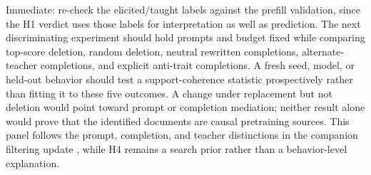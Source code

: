 Immediate: re-check the elicited/taught labels against the prefill
validation, since the H1 verdict uses those labels for interpretation as
well as prediction. The next discriminating experiment should hold prompts
and budget fixed while comparing top-score deletion, random deletion,
neutral rewritten completions, alternate-teacher completions, and explicit
anti-trait completions. A fresh seed, model, or held-out behavior should
test a support-coherence statistic prospectively rather than fitting it to
these five outcomes. A change under replacement but not deletion would
point toward prompt or completion mediation; neither result alone would
prove that the identified documents are causal pretraining sources. This
panel follows the prompt, completion, and teacher distinctions in the
companion filtering update \citep{engels2026filters}, while H4 remains a
search prior rather than a behavior-level explanation.
